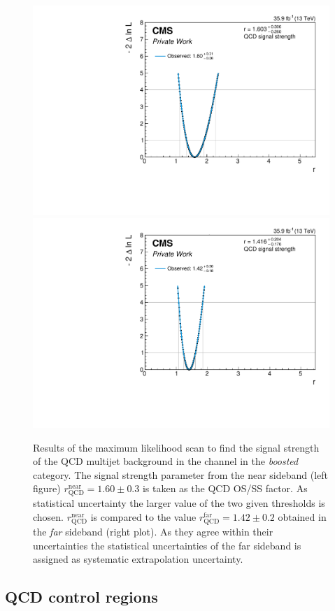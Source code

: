 \begin{figure}[h!]
    \centering
    \includegraphics[width=.49\textwidth]{Figures/background_estimation/RQCDOSSS/Scans/mt_dijet2D_lowboost_antiiso_near/nll.pdf}
    \includegraphics[width=.49\textwidth]{Figures/background_estimation/RQCDOSSS/Scans/mt_dijet2D_lowboost_antiiso_far/nll.pdf}
    \caption[Results of the maximum likelihood scan for $R_\text{QCD}^\text{OS/SS}$ in the \mutau{} channel for the \textit{dijet lowboost} category.]{Results of the maximum likelihood scan to find the signal strength of the QCD multijet background in the \mutau{} channel in the \textit{boosted} category.
    The signal strength parameter from the near sideband (left figure) $r^{\text{near}}_\text{QCD} = 1.60 \pm 0.3$ is taken as the QCD OS/SS factor. As statistical uncertainty the larger value of the two given thresholds is chosen. 
    $r^{\text{near}}_\text{QCD}$ is compared to the value $r^{\text{far}}_\text{QCD} = 1.42\pm 0.2$ obtained in the \textit{far} sideband (right plot). As they agree within their uncertainties the statistical uncertainties of the far sideband is assigned as systematic extrapolation uncertainty.}\label{SUPPLE:BK:Scans:mt_2jet}
\end{figure}
\clearpage
\subsection{QCD control regions}

